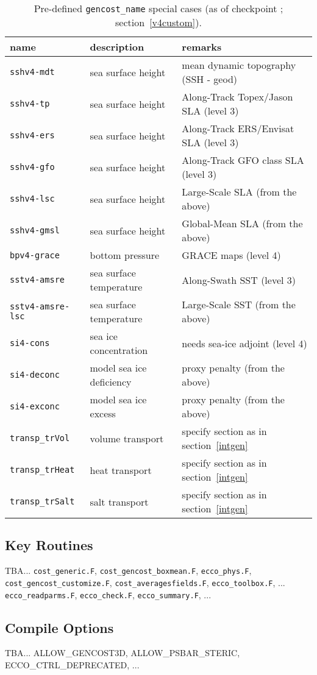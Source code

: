 \begin{table}[!ht]
\centering
\begin{tabular}{lll}
name					&	description				&	remarks \\ \hline\hline
\texttt{sshv4-mdt}			&	sea surface height			&	mean dynamic topography (SSH - geod) \\
\texttt{sshv4-tp}				&	sea surface height			&	Along-Track Topex/Jason SLA (level 3) \\
\texttt{sshv4-ers}			&	sea surface height			&	Along-Track ERS/Envisat SLA (level 3)\\
\texttt{sshv4-gfo}			&	sea surface height			&	Along-Track GFO class SLA (level 3)\\
\texttt{sshv4-lsc}			&	sea surface height			&	Large-Scale SLA (from the above)\\
\texttt{sshv4-gmsl}			&	sea surface height			&	Global-Mean SLA (from the above)\\ \hline
\texttt{bpv4-grace}			&	bottom pressure			&	GRACE maps (level 4) \\ \hline
\texttt{sstv4-amsre}			&	sea surface temperature		&	Along-Swath SST (level 3)\\
\texttt{sstv4-amsre-lsc}		&	sea surface temperature		&	Large-Scale SST (from the above)\\ \hline
\texttt{si4-cons}				&	sea ice concentration		& 	needs sea-ice adjoint (level 4)\\
\texttt{si4-deconc}			&	model sea ice deficiency		& 	proxy penalty (from the above)\\
\texttt{si4-exconc}			&	model sea ice excess		& 	proxy penalty (from the above)\\ \hline
\texttt{transp\_trVol}			&	volume transport			& specify section as in section~\ref{intgen}\\ 
\texttt{transp\_trHeat}		&	heat transport				& specify section as in section~\ref{intgen} \\ 
\texttt{transp\_trSalt}			&	salt transport				& specify section as in section~\ref{intgen} \\ 
\end{tabular}
\caption{Pre-defined \texttt{gencost\_name} special cases (as of checkpoint \mitgcmCheckpointVersion; section~\ref{v4custom}).}
\label{tbl:gencost_ecco_name}
\end{table}

\subsection{Key Routines}

TBA... \texttt{cost\_generic.F}, \texttt{cost\_gencost\_boxmean.F}, \texttt{ecco\_phys.F}, \texttt{cost\_gencost\_customize.F}, \texttt{cost\_averagesfields.F}, \texttt{ecco\_toolbox.F}, ... \texttt{ecco\_readparms.F}, \texttt{ecco\_check.F}, \texttt{ecco\_summary.F}, ...

\subsection{Compile Options}

TBA... ALLOW\_GENCOST3D, ALLOW\_PSBAR\_STERIC, ECCO\_CTRL\_DEPRECATED, ...
